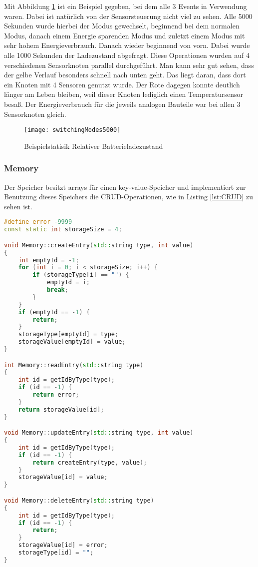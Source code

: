 Mit Abbildung \ref{fig:switchingModes5000} ist ein Beispiel gegeben, bei dem alle 3 Events in Verwendung waren. Dabei ist natürlich von der Sensorsteuerung nicht viel zu sehen. Alle 5000 Sekunden wurde hierbei der Modus gewechselt, beginnend bei dem normalen Modus, danach einem Energie sparenden Modus und zuletzt einem Modus mit sehr hohem Energieverbrauch. Danach wieder beginnend von vorn. Dabei wurde alle 1000 Sekunden der Ladezustand abgefragt. Diese Operationen wurden auf 4 verschiedenen Sensorknoten parallel durchgeführt. Man kann sehr gut sehen, dass der gelbe Verlauf besonders schnell nach unten geht. Das liegt daran, dass dort ein Knoten mit 4 Sensoren genutzt wurde. Der Rote dagegen konnte deutlich länger am Leben bleiben, weil dieser Knoten lediglich einen Temperatursensor besaß. Der Energieverbrauch für die jeweils analogen Bauteile war bei allen 3 Sensorknoten gleich.

\begin{figure}[htbp]
\centering
\caption{Beispielstatisik Relativer Batterieladezustand}
\label{fig:switchingModes5000}
\texttt{[image: switchingModes5000]}
\end{figure}

\subsubsection{Memory}

Der Speicher besitzt arrays für einen key-value-Speicher und implementiert zur Benutzung dieses Speichers die CRUD-Operationen, wie in Listing \ref{lst:CRUD} zu sehen ist.

\begin{lstlisting}[language=C++, label=lst:CRUD, caption=CRUD-Operationen vom Memory]
#define error -9999
const static int storageSize = 4;

void Memory::createEntry(std::string type, int value)
{
    int emptyId = -1;
    for (int i = 0; i < storageSize; i++) {
        if (storageType[i] == "") {
            emptyId = i;
            break;
        }
    }
    if (emptyId == -1) {
        return;
    }
    storageType[emptyId] = type;
    storageValue[emptyId] = value;
}

int Memory::readEntry(std::string type)
{
    int id = getIdByType(type);
    if (id == -1) {
        return error;
    }
    return storageValue[id];
}

void Memory::updateEntry(std::string type, int value)
{
    int id = getIdByType(type);
    if (id == -1) {
        return createEntry(type, value);
    }
    storageValue[id] = value;
}

void Memory::deleteEntry(std::string type)
{
    int id = getIdByType(type);
    if (id == -1) {
        return;
    }
    storageValue[id] = error;
    storageType[id] = "";
}
\end{lstlisting}

